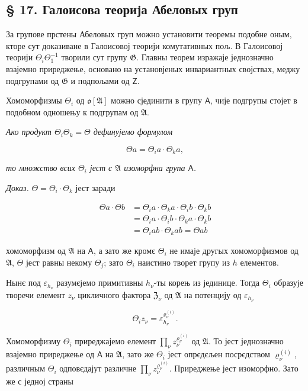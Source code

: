 \documentclass[11pt]{article}
\begin{document}
\subsection*{§ 17. Галоисова теорија Абеловых груп}\label{die-galoissche-theorie-abelscher-gruppen}

За групове прстены Абеловых груп можно установити теоремы подобне оным, кторе сут доказиване в Галоисовој теорији комутативных пољ. В Галоисовој теорији \(\Theta_i\Theta_1^{-1}\) творили сут групу \(\mathfrak{G}\). Главны теорем изражаје једнозначно взајемно приреджење, основано на установјеных инвариантных својствах, меджу подгрупами од \(\mathfrak{G}\) и подпољами од \(\mathsf{Z}\).

Хомоморфизмы \(\Theta_i\) од \(\mathfrak{o}[\mathfrak{A}]\) можно сјединити в групу \(\mathsf A\), чије подгрупы стојет в подобном одношењу к подгрупам од \(\mathfrak{A}\).

\emph{Ако продукт \(\Theta_i \Theta_k = \Theta\) дефинујемо формулом}

\[\Theta a = \Theta_i a \cdot \Theta_k a,\]

\emph{то множство всих \(\Theta_i\) јест с \(\mathfrak A\) изоморфна група \(\mathsf A\).}

\emph{Доказ.} \(\Theta = \Theta_i \cdot \Theta_k\) јест заради

\[\begin{aligned}
\Theta a \cdot \Theta b &= \Theta_i a \cdot \Theta_k a \cdot \Theta_i b \cdot \Theta_k b \\
&= \Theta_i a \cdot \Theta_i b \cdot \Theta_k a \cdot \Theta_k b \\
&= \Theta_i a b \cdot \Theta_k a b = \Theta a b
\end{aligned}\]

хомоморфизм од \(\mathfrak A\) на \(\mathsf A\), а зато же кромє \(\Theta_i\) не имаје другых хомоморфизмов од \(\mathfrak A\), \(\Theta\) јест равны некому \(\Theta_j\); зато \(\Theta_i\) наистино творет групу из \(h\) елементов.

Нынє под \(\varepsilon_{h_\nu}\) разумєјемо примитивны \(h_\nu\)-ты корењ из јединице. Тогда \(\Theta_i\) образује творечи елемент \(z_\nu\) цикличного фактора \(\mathfrak Z_\nu\) од \(\mathfrak A\) на потенцију од \(\varepsilon_{h_\nu}\)

\[
\Theta_i z_\nu=\varepsilon_{h_\nu}^{\varrho_\nu^{(i)}}.
\]

Хомоморфизму \(\Theta_i\) приреджајемо елемент \(\prod_\nu z_\nu^{\varrho_\nu^{(i)}}\) од \(\mathfrak A\). То јест једнозначно взајемно приреджење од \(\mathsf A\) на \(\mathfrak A\), зато же \(\Theta_i\) јест опрєдєљен посрєдством \(\varrho_\nu^{(i)}\), различным \(\Theta_i\) одповєдајут различне \(\prod_\nu z_\nu^{\varrho_\nu^{(i)}}\). Приреджење јест изоморфно. Зато же с једној страны
\end{document}
